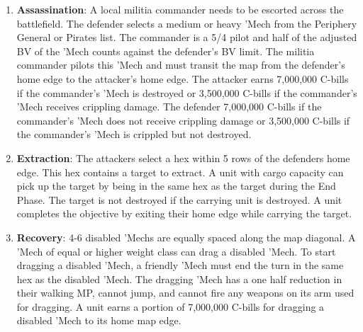 \begin{enumerate}
\item {\bfseries Assassination}: A local militia commander needs to be escorted across the battlefield.
The defender selects a medium or heavy 'Mech from the Periphery General or Pirates list.
The commander is a 5/4 pilot and half of the adjusted BV of the 'Mech counts against the defender's BV limit.
The militia commander pilots this 'Mech and must transit the map from the defender's home edge to the attacker's home edge.
The attacker earns 7,000,000 C-bills if the commander's 'Mech is destroyed or 3,500,000 C-bills if the commander's 'Mech receives crippling damage.
The defender 7,000,000 C-bills if the commander's 'Mech does not receive crippling damage  or 3,500,000 C-bills if the commander's 'Mech is crippled but not destroyed.

\item {\bfseries Extraction}: The attackers select a hex within 5 rows of the defenders home edge.
This hex contains a target to extract.
A unit with cargo capacity can pick up the target by being in the same hex as the target during the End Phase.
The target is not destroyed if the carrying unit is destroyed.
A unit completes the objective by exiting their home edge while carrying the target.

\item {\bfseries Recovery}: 4-6 disabled 'Mechs are equally spaced along the map diagonal.
A 'Mech of equal or higher weight class can drag a disabled 'Mech.
To start dragging a disabled 'Mech, a friendly 'Mech must end the turn in the same hex as the disabled 'Mech.
The dragging 'Mech has a one half reduction in their walking MP, cannot jump, and cannot fire any weapons on its arm used for dragging.
A unit earns a portion of 7,000,000 C-bills for dragging a disabled 'Mech to its home map edge.

\end{enumerate}
